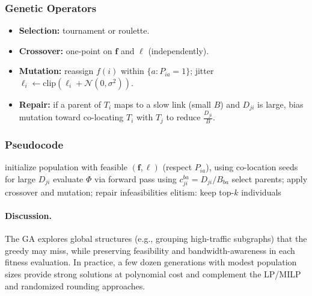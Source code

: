 \subsubsection{Genetic Operators}
\begin{itemize}[leftmargin=*]
    \item \textbf{Selection:} tournament or roulette.
    \item \textbf{Crossover:} one-point on \(\mathbf{f}\) and \(\boldsymbol{\ell}\) (independently).
    \item \textbf{Mutation:} reassign \(f(i)\) within \(\{a:P_{ia}=1\}\); jitter \(\ell_i\leftarrow\text{clip}(\ell_i+\mathcal{N}(0,\sigma^2))\).
    \item \textbf{Repair:} if a parent of \(T_i\) maps to a slow link (small \(B\)) and \(D_{ji}\) is large, bias mutation toward co-locating \(T_i\) with \(T_j\) to reduce \(\tfrac{D_{ji}}{B}\).
\end{itemize}

\subsubsection{Pseudocode}
\begin{algorithm}[t]
\caption{Genetic Algorithm for Bandwidth/Data-Aware Fog Scheduling}
\label{alg:genetic}
\begin{algorithmic}[1]
\STATE initialize population with feasible \((\mathbf{f},\boldsymbol{\ell})\) (respect \(P_{ia}\)), using co-location seeds for large \(D_{ji}\)
\REPEAT
    \STATE evaluate $\Phi$ via forward pass using $c_{ji}^{ba}=D_{ji}/B_{ba}$
    \STATE select parents; apply crossover and mutation; repair infeasibilities
    \STATE elitism: keep top-$k$ individuals
\end{algorithmic}
\end{algorithm}

\paragraph{Discussion.} The GA explores global structures (e.g., grouping high-traffic subgraphs) that the greedy may miss, while preserving feasibility and bandwidth-awareness in each fitness evaluation. In practice, a few dozen generations with modest population sizes provide strong solutions at polynomial cost and complement the LP/MILP and randomized rounding approaches.
